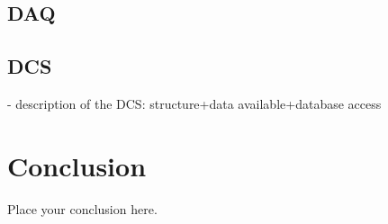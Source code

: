\documentclass[UKenglish,texlive=2013]{\ATLASLATEXPATH atlasdoc}
\begin{document}
\subsection{DAQ}
\label{sec:daq}




\subsection{DCS}




- description of the DCS: structure+data available+database access




\section{Conclusion}
\label{sec:conclusion}

Place your conclusion here.

\begin{comment}
\section*{Acknowledgements}

%

The \texttt{atlaslatex} package contains the acknowledgements that were valid 
at the time of the release you are using.
These can be found in the \texttt{acknowledgements} subdirectory.
When your ATLAS paper or PUB/CONF note is ready to be published,
download the latest set of acknowledgements from:\\
\url{https://twiki.cern.ch/twiki/bin/view/AtlasProtected/PubComAcknowledgements}

The supporting notes for the analysis should also contain a list of contributors.
This information should usually be included in \texttt{mydocument-metadata.tex}.
The list should be printed either here or before the table of contents.
\end{comment}

\clearpage
\appendix
\end{document}
